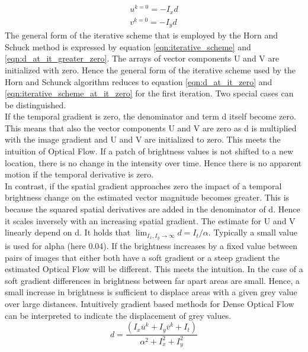 \begin{equation}
  \begin{array}{l}
    u^{k=0}= - I_x d \\
    v^{k=0}= - I_y d
  \end{array}
\label{eqn:iterative_scheme_at_it_zero}
\end{equation}
The general form of the iterative scheme that is employed by the Horn and Schuck method is expressed by equation \ref{eqn:iterative_scheme} and \ref{eqn:d_at_it_greater_zero}. The arrays of vector components U and V are initialized with zero. Hence the general form of the iterative scheme used by the Horn and Schunck algorithm reduces to equation \ref{eqn:d_at_it_zero} and \ref{eqn:iterative_scheme_at_it_zero} for the first iteration. Two special cases can be distinguished.\\
If the temporal gradient is zero, the denominator and term d itself become zero. This means that also the vector components U and V are zero as d is multiplied with the image gradient and U and V are initialized to zero. This meets the intuition of Optical Flow. If a patch of brightness values is not shifted to a new location, there is no change in the intensity over time. Hence there is no apparent motion if the temporal derivative is zero.\\
In contrast, if the spatial gradient approaches zero the impact of a temporal brightness change on the estimated vector magnitude becomes greater. This is because the squared spatial derivatives are added in the denominator of d. Hence it scales inversely with an increasing spatial gradient. The estimate for U and V linearly depend on d. It holds that $\lim_{{I_x, I_y}\to\infty} d = I_t/\alpha $. Typically a small value is used for alpha (here 0.04). If the brightness increases by a fixed value between pairs of images that either both have a soft gradient or a steep gradient the estimated Optical Flow will be different. This meets the intuition. In the case of a soft gradient differences in brightness between far apart areas are small. Hence, a small increase in brightness is sufficient to displace areas with a given grey value over large distances. Intuitively gradient based methods for Dense Optical Flow can be interpreted to indicate the displacement of grey values.\\
\begin{equation}
  d = \frac{(I_x\overline{u}^k+I_y\overline{v}^k+I_t)}{\alpha^2+I_x^2+I_y^2}
\label{eqn:d_at_it_greater_zero}
\end{equation}

